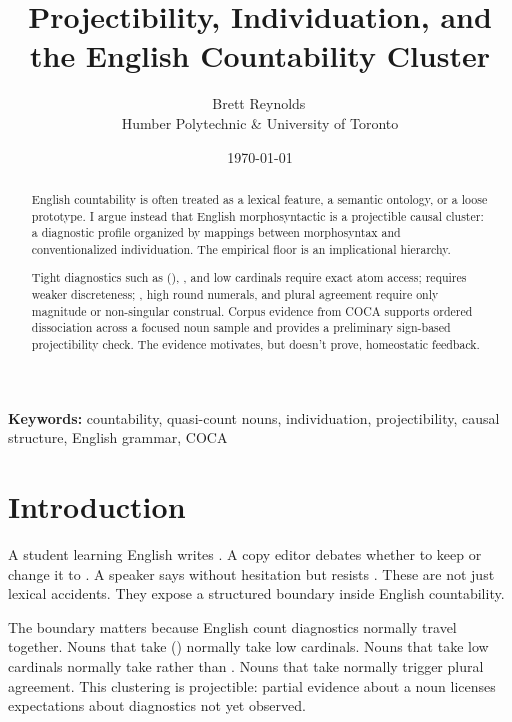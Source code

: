 \documentclass[12pt,a4paper]{article}
\title{Projectibility, Individuation, and the English Countability Cluster}
\author{Brett Reynolds\,\orcidlink{0000-0003-0073-7195}\\Humber Polytechnic \& University of Toronto}
\date{\today}
\begin{document}
\maketitle

\noindent\textbf{Keywords:} countability, quasi-count nouns, individuation, projectibility, causal structure, English grammar, COCA

\begin{abstract}
English countability is often treated as a lexical feature, a semantic ontology, or a loose prototype. I argue instead that English morphosyntactic  is a projectible causal cluster: a diagnostic profile organized by mappings between morphosyntax and conventionalized individuation. The empirical floor is an implicational hierarchy.

Tight diagnostics such as (), , and low cardinals require exact atom access;  requires weaker discreteness; , high round numerals, and plural agreement require only magnitude or non-singular construal. Corpus evidence from COCA supports ordered dissociation across a focused noun sample and provides a preliminary sign-based projectibility check. The evidence motivates, but doesn't prove, homeostatic feedback.
\end{abstract}

\section{Introduction}

A student learning English writes . A copy editor debates whether to keep  or change it to . A speaker says  without hesitation but resists . These are not just lexical accidents. They expose a structured boundary inside English countability.

The boundary matters because English count diagnostics normally travel together. Nouns that take () normally take low cardinals. Nouns that take low cardinals normally take  rather than . Nouns that take  normally trigger plural agreement. This clustering is projectible: partial evidence about a noun licenses expectations about diagnostics not yet observed.
\end{document}

